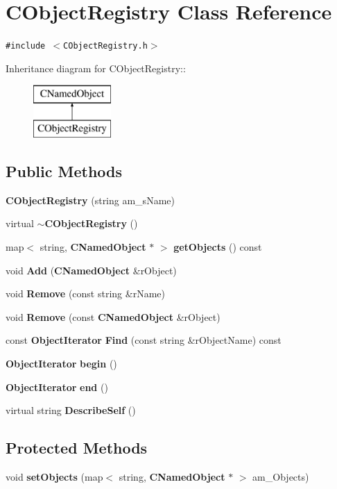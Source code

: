 \section{CObject\-Registry  Class Reference}
\label{classCObjectRegistry}
{\tt \#include $<$CObject\-Registry.h$>$}

Inheritance diagram for CObject\-Registry::\begin{figure}[H]
\begin{center}
\leavevmode
\includegraphics[height=2cm]{classCObjectRegistry}
\end{center}
\end{figure}
\subsection*{Public Methods}
\begin{CompactItemize}
\item 
{\bf CObject\-Registry} (string am\_\-s\-Name)
\item 
virtual {\bf $\sim$CObject\-Registry} ()
\item 
map$<$ string, {\bf CNamed\-Object} $\ast$ $>$ {\bf get\-Objects} () const
\item 
void {\bf Add} ({\bf CNamed\-Object} \&r\-Object)
\item 
void {\bf Remove} (const string \&r\-Name)
\item 
void {\bf Remove} (const {\bf CNamed\-Object} \&r\-Object)
\item 
const {\bf Object\-Iterator} {\bf Find} (const string \&r\-Object\-Name) const
\item 
{\bf Object\-Iterator} {\bf begin} ()
\item 
{\bf Object\-Iterator} {\bf end} ()
\item 
virtual string {\bf Describe\-Self} ()
\end{CompactItemize}
\subsection*{Protected Methods}
\begin{CompactItemize}
\item 
void {\bf set\-Objects} (map$<$ string, {\bf CNamed\-Object} $\ast$ $>$ am\_\-Objects)
\end{CompactItemize}
